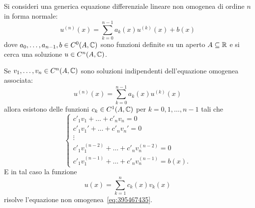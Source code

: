 \begin{theorem}
\mymark{***}%
Si consideri una generica equazione differenziale lineare non omogenea di ordine $n$ in forma normale:
\begin{equation}\label{eq:395467435}
  u^{(n)}(x) = \sum_{k=0}^{n-1} a_k(x) u^{(k)}(x) + b(x)
\end{equation}
dove $a_0, \dots, a_{n-1}, b\in C^0(A,{\mathbb C})$ sono funzioni definite su un aperto $A\subseteq {\mathbb R}$
e si cerca una soluzione $u\in C^n(A,{\mathbb C})$.

Se $v_1, \dots, v_n\in C^n(A,{\mathbb C})$ sono soluzioni indipendenti dell'equazione omogenea associata:
\begin{equation*}
  u^{(n)}(x) = \sum_{k=0}^{n-1} a_k(x) u^{(k)}(x)
\end{equation*}
allora
esistono delle funzioni $c_k\in C^1(A,{\mathbb C})$
per $k=0,1, \dots, n-1$
tali che
\begin{equation}\label{eq:02154676}
  \begin{cases}
    c'_1 v_1 + \dots + c'_n v_n = 0 \\
    c'_1 v_1' + \dots + c'_n v_n' = 0 \\
    \vdots\\
    c'_1 v_1^{(n-2)} + \dots + c'_n v_n^{(n-2)} = 0 \\
    c'_1 v_1^{(n-1)} + \dots + c'_n v_n^{(n-1)} = b(x).
  \end{cases}
\end{equation}
E in tal caso la funzione
\[
 u(x) = \sum_{k=1}^n c_k(x) v_k(x)
\]
risolve l'equazione non omogenea~\eqref{eq:395467435}.
\end{theorem}
%
